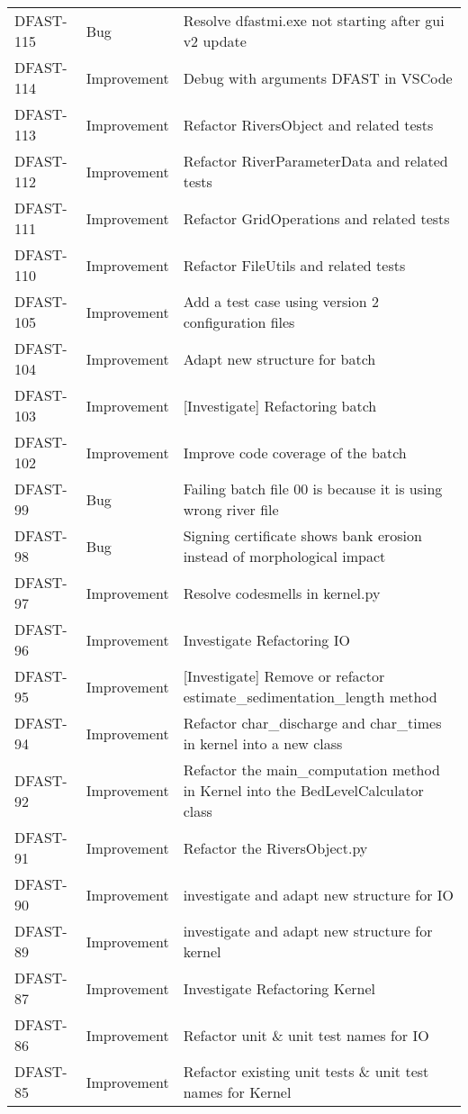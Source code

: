 \documentclass[git]{deltares_manual}
\begin{document}
\begin{longtable}{l|l|p{8cm}}
DFAST-115 & Bug & Resolve dfastmi.exe not starting after gui v2 update \\
DFAST-114 & Improvement & Debug with arguments DFAST in VSCode \\
DFAST-113 & Improvement & Refactor RiversObject and related tests \\
DFAST-112 & Improvement & Refactor RiverParameterData and related tests \\
DFAST-111 & Improvement & Refactor GridOperations and related tests \\
DFAST-110 & Improvement & Refactor FileUtils and related tests \\
DFAST-105 & Improvement & Add a test case using version 2 configuration files \\
DFAST-104 & Improvement & Adapt new structure for batch \\
DFAST-103 & Improvement & [Investigate] Refactoring batch \\
DFAST-102 & Improvement & Improve code coverage of the batch \\
DFAST-99 & Bug & Failing batch file 00 is because it is using wrong river file \\
DFAST-98 & Bug & Signing certificate shows bank erosion instead of morphological impact \\
DFAST-97 & Improvement & Resolve codesmells in kernel.py \\
DFAST-96 & Improvement & Investigate Refactoring IO \\
DFAST-95 & Improvement & [Investigate] Remove or refactor estimate\_sedimentation\_length method \\
DFAST-94 & Improvement & Refactor char\_discharge and char\_times in kernel into a new class \\
DFAST-92 & Improvement & Refactor the main\_computation method in Kernel into the BedLevelCalculator class \\
DFAST-91 & Improvement & Refactor the RiversObject.py \\
DFAST-90 & Improvement & investigate and adapt new structure for IO \\
DFAST-89 & Improvement & investigate and adapt new structure for kernel \\
DFAST-87 & Improvement & Investigate Refactoring Kernel \\
DFAST-86 & Improvement & Refactor unit \& unit test names for IO \\
DFAST-85 & Improvement & Refactor existing unit tests \& unit test names for Kernel \\

\end{longtable}
\end{document}
